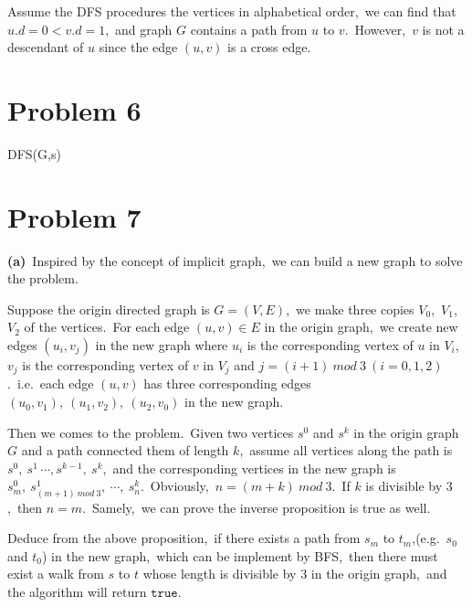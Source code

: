 \documentclass[]{article}
\begin{document}
    Assume the DFS procedures the vertices in alphabetical order,\ we can find that $u.d = 0 < v.d = 1$,\ and graph $G$ contains a path from $u$ to $v$.\ However,\ $v$ is not a descendant of $u$ since the edge $(u,v)$ is a cross edge.
	
	\section{Problem 6}
	\begin{algorithm}[H]
		\caption{DFS(G,s)} %
		\begin{algorithmic}[1]
			\Else
			\EndIf
			\Else
			\EndIf
			\EndFor
		\end{algorithmic}
	\end{algorithm}

	\section{Problem 7}
	\textbf{(a)}\ Inspired by the concept of implicit graph,\ we can build a new graph to solve the problem.
	
	Suppose the origin directed graph is $G = (V,E)$,\ we make three copies $V_0$,\ $V_1$,\ $V_2$ of the vertices.\ For each edge $(u,v)\in E$ in the origin graph,\ we create new edges $(u_i,v_j)$ in the new graph where $u_i$ is the corresponding vertex of $u$ in $V_i$,\ $v_j$ is the corresponding vertex of $v$ in $V_j$ and $j = (i+1)\ mod\ 3\ (i=0,1,2)$.\ i.e.\ each edge $(u,v)$ has three corresponding edges $(u_0,v_1),\ (u_1,v_2),\ (u_2,v_0)$ in the new graph.
 
 	Then we comes to the problem.\ Given two vertices $s^0$ and $s^k$ in the origin graph $G$ and a path connected them of length $k$,\ assume all vertices along the path is $s^0,\ s^1\, \cdots, s^{k-1},\ s^k$,\ and the corresponding vertices in the new graph is $s^0_m,\ s^1_{(m+1)\ mod\ 3},\ \cdots,\ s^k_n$.\ Obviously,\ $n = (m+k)\ mod\ 3$.\ If $k$ is divisible by $3$,\ then $n = m$.\ Samely,\ we can prove the inverse proposition is true as well.
 	
 	Deduce from the above proposition,\ if there exists a path from $s_m$ to $t_m$,(e.g.\ $s_0$ and $t_0$) in the new graph,\ which can be implement by BFS,\ then there must exist a walk from $s$ to $t$ whose length is divisible by $3$ in the origin graph,\ and the algorithm will return $\mathtt{true}$.
\end{document}
